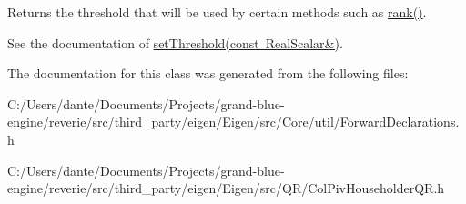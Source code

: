 Returns the threshold that will be used by certain methods such as \mbox{\hyperlink{class_eigen_1_1_col_piv_householder_q_r_a2a59aaa689613ce5ef0c9130ad33940e}{rank()}}.

See the documentation of \mbox{\hyperlink{class_eigen_1_1_col_piv_householder_q_r_ae712cdc9f0e521cfc8061bee58ff55ee}{set\+Threshold(const Real\+Scalar\&)}}. 

The documentation for this class was generated from the following files\+:\begin{DoxyCompactItemize}
\item 
C\+:/\+Users/dante/\+Documents/\+Projects/grand-\/blue-\/engine/reverie/src/third\+\_\+party/eigen/\+Eigen/src/\+Core/util/Forward\+Declarations.\+h\item 
C\+:/\+Users/dante/\+Documents/\+Projects/grand-\/blue-\/engine/reverie/src/third\+\_\+party/eigen/\+Eigen/src/\+Q\+R/Col\+Piv\+Householder\+Q\+R.\+h\end{DoxyCompactItemize}
